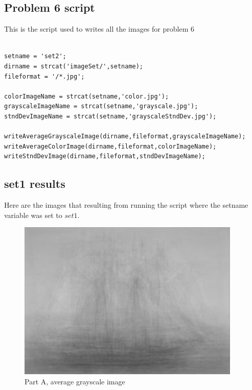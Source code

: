 \documentclass[11pt,psfig]{article}
\begin{document}
\subsection*{Problem 6 script}

This is the script used to writes all the images for problem 6

\begin{verbatim}

setname = 'set2';
dirname = strcat('imageSet/',setname);
fileformat = '/*.jpg';

colorImageName = strcat(setname,'color.jpg');
grayscaleImageName = strcat(setname,'grayscale.jpg');
stndDevImageName = strcat(setname,'grayscaleStndDev.jpg');

writeAverageGrayscaleImage(dirname,fileformat,grayscaleImageName);
writeAverageColorImage(dirname,fileformat,colorImageName);
writeStndDevImage(dirname,fileformat,stndDevImageName);

\end{verbatim}

\subsection*{set1 results}

Here are the images that resulting from running the script where the setname variable was set to $set1$. 

\begin{figure}[H]
\centering
\includegraphics[height=3in]{set1grayscale.jpg}
\caption{Part A, average grayscale image}
\end{figure}
\end{document}
